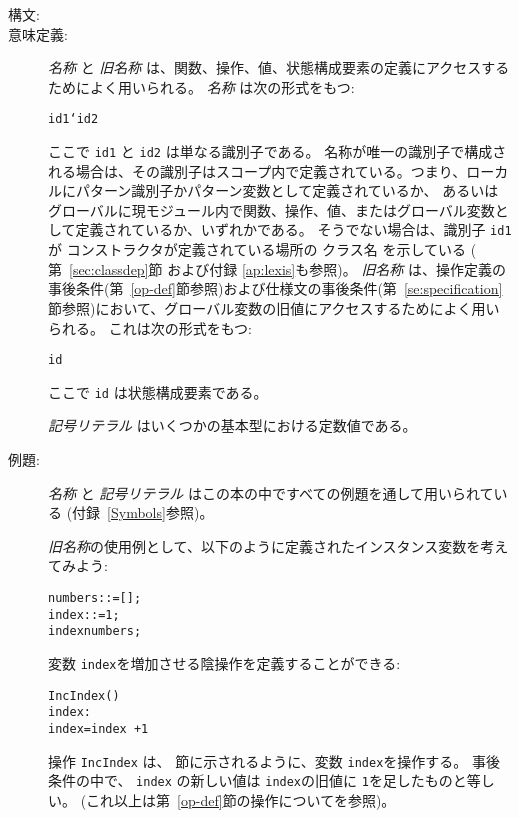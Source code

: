 \documentclass[\pformat,12pt]{jarticle}
\begin{document}
\begin{description}
\item[構文:]




\item[意味定義:] {\it 名称\/} と {\it 旧名称\/} は、関数、操作、値、状態構成要素の定義にアクセスするためによく用いられる。
 {\it 名称\/} は次の形式をもつ:
  \begin{alltt}
    id1`id2
  \end{alltt}
ここで {\tt id1} と {\tt id2} は単なる識別子である。
名称が唯一の識別子で構成される場合は、その識別子はスコープ内で定義されている。つまり、ローカルにパターン識別子かパターン変数として定義されているか、
あるいはグローバルに現モジュール内で関数、操作、値、またはグローバル変数として定義されているか、いずれかである。
そうでない場合は、識別子 {\tt id1}が
コンストラクタが定義されている場所の
クラス名
を示している (
第~\ref{sec:classdep}節
および付録 \ref{ap:lexis}も参照)。
 {\it 旧名称\/} は、操作定義の事後条件(第~\ref{op-def}節参照)および仕様文の事後条件(第~\ref{se:specification}節参照)において、グローバル変数の旧値にアクセスするためによく用いられる。
これは次の形式をもつ:

  \begin{alltt} 
    id~ 
  \end{alltt} 
 ここで {\tt id} は状態構成要素である。

  {\it 記号リテラル\/} はいくつかの基本型における定数値である。

\item[例題:] {\it 名称} と {\it 記号リテラル\/} はこの本の中ですべての例題を通して用いられている (付録~\ref{Symbols}参照)。


 {\it 旧名称}の使用例として、以下のように定義されたインスタンス変数を考えてみよう:
  \begin{alltt}
      numbers:  := [];
      index  :  := 1;
     index  numbers;
  \end{alltt}

 変数 {\tt index}を増加させる陰操作を定義することができる:
  \begin{alltt}
    IncIndex()
     index : 
     index = index~ + 1
  \end{alltt}
 操作 {\tt IncIndex} は、 節に示されるように、変数 {\tt index}を操作する。
事後条件の中で、 {\tt index} の新しい値は {\tt index}の旧値に  \texttt{1}を足したものと等しい。
(これ以上は第~\ref{op-def}節の操作についてを参照)。


\end{description}
\end{document}
